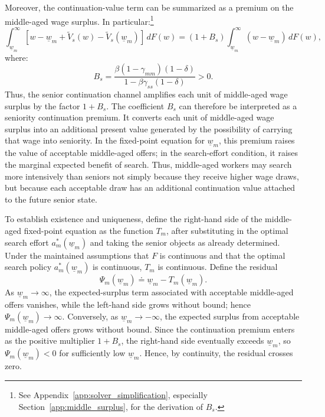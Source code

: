 \documentclass{article}
\newcommand{\lbar}[1]{\underline{#1}} %
\begin{document}
Moreover, the continuation-value term can be summarized as a premium on the middle-aged wage surplus. In particular:\footnote{See Appendix~\ref{app:solver_simplification}, especially Section~\ref{app:middle_surplus}, for the derivation of $B_s$.}
\[
\int_{\lbar w_m}^{\infty}
\left[
w-\lbar w_m+\tilde V_s(w)-\tilde V_s(\lbar w_m)
\right]\,dF(w)
=
(1+B_s)
\int_{\lbar w_m}^{\infty}
(w-\lbar w_m)\,dF(w),
\]
where:
\[
B_s
=
\frac{\beta(1-\gamma_{mm})(1-\delta)}
{1-\beta\gamma_{ss}(1-\delta)}
>0.
\]
Thus, the senior continuation channel amplifies each unit of middle-aged wage surplus by the factor $1+B_s$. The coefficient $B_s$ can therefore be interpreted as a seniority continuation premium. It converts each unit of middle-aged wage surplus into an additional present value generated by the possibility of carrying that wage into seniority. In the fixed-point equation for $\lbar w_m$, this premium raises the value of acceptable middle-aged offers; in the search-effort condition, it raises the marginal expected benefit of search. Thus, middle-aged workers may search more intensively than seniors not simply because they receive higher wage draws, but because each acceptable draw has an additional continuation value attached to the future senior state.

To establish existence and uniqueness, define the right-hand side of the middle-aged fixed-point equation as the function $T_m$, after substituting in the optimal search effort $a_m^*(\lbar w_m)$ and taking the senior objects as already determined. Under the maintained assumptions that $F$ is continuous and that the optimal search policy $a_m^*(\lbar w_m)$ is continuous, $T_m$ is continuous. Define the residual
\[
\Psi_m(\lbar w_m)\doteq \lbar w_m-T_m(\lbar w_m).
\]
As $\lbar w_m\to\infty$, the expected-surplus term associated with acceptable middle-aged offers vanishes, while the left-hand side grows without bound; hence $\Psi_m(\lbar w_m)\to\infty$. Conversely, as $\lbar w_m\to-\infty$, the expected surplus from acceptable middle-aged offers grows without bound. Since the continuation premium enters as the positive multiplier $1+B_s$, the right-hand side eventually exceeds $\lbar w_m$, so $\Psi_m(\lbar w_m)<0$ for sufficiently low $\lbar w_m$. Hence, by continuity, the residual crosses zero.
\end{document}
